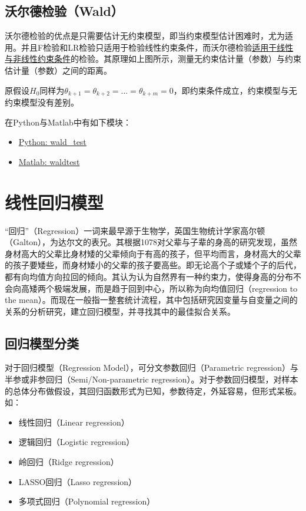 \documentclass[11pt]{article}
\begin{document}
\subsection{沃尔德检验（Wald）}

沃尔德检验的优点是只需要估计无约束模型，即当约束模型估计困难时，尤为适用。并且F检验和LR检验只适用于检验线性约束条件，而沃尔德检验\uline{适用于线性与非线性约束条件}的检验。其原理如上图所示，测量无约束估计量（参数）与约束估计量（参数）之间的距离。

原假设$H_0$同样为$\theta_{k+1}=\theta_{k+2}=\dots=\theta_{k+m}=0$，即约束条件成立，约束模型与无约束模型没有差别。

\begin{remark}
    在Python与Matlab中有如下模块：
    \begin{itemize}
        \item \href{https://www.statsmodels.org/stable/generated/statsmodels.regression.linear_model.RegressionResults.wald_test.html}{Python: wald\_test}
        \item \href{https://www.mathworks.com/help/econ/waldtest.html}{Matlab: waldtest}
    \end{itemize}
\end{remark}

\section{线性回归模型}

“回归”（Regression）一词来最早源于生物学，英国生物统计学家高尔顿（Galton），为达尔文的表兄。其根据1078对父辈与子辈的身高的研究发现，虽然身材高大的父辈比身材矮的父辈倾向于有高的孩子，但平均而言，身材高大的父辈的孩子要矮些，而身材矮小的父辈的孩子要高些。即无论高个子或矮个子的后代，都有向均值方向拉回的倾向。其认为认为自然界有一种约束力，使得身高的分布不会向高矮两个极端发展，而是趋于回到中心，所以称为向均值回归（regression to the mean）。而现在一般指一整套统计流程，其中包括研究因变量与自变量之间的关系的分析研究，建立回归模型，并寻找其中的最佳拟合关系。

\subsection{回归模型分类}

对于回归模型（Regression Model），可分文参数回归（Parametric regression）与半参或非参回归（Semi/Non-parametric regression）。对于参数回归模型，对样本的总体分布做假设，其回归函数形式为已知，参数待定，外延容易，但形式呆板。如：
\begin{itemize}
    \item 线性回归（Linear regression）
    \item 逻辑回归（Logistic regression）
    \item 岭回归（Ridge regression）
    \item LASSO回归（Lasso regression）
    \item 多项式回归（Polynomial regression）
\end{itemize}
\end{document}

